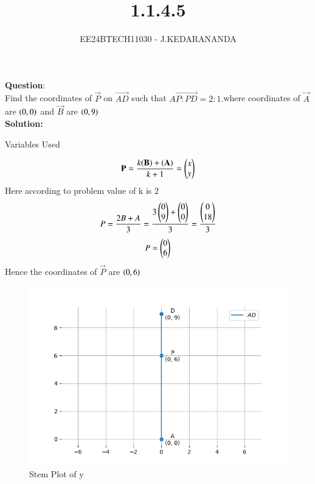 \documentclass[journal]{IEEEtran}
\begin{document}

\vspace{3cm}

\title{1.1.4.5}
\author{EE24BTECH11030 - J.KEDARANANDA
}
{\let\newpage\relax\maketitle}

\renewcommand{\thefigure}{\theenumi}
\renewcommand{\thetable}{\theenumi}
\setlength{\intextsep}{10pt} %


\renewcommand{\thetable}{\theenumi}


\textbf{Question}:\\
Find the coordinates of $\vec{P}$ on $\vec{AD}$ such that $\vec{AP:PD}=2:1.$where coordinates of $\vec{A}$ are $\left(0,0\right)$ and $\vec{B}$ are $\left(0,9\right)$
\\
\textbf{Solution: }
\begin{table}[h!]    
  \centering
  
  \caption{Variables Used}
  \label{tab10.5.3.9.1}
\end{table}
\begin{align}
\mathbf{P}=\frac{k(\mathbf{B})+(\mathbf{A})}{k+1}=\begin{pmatrix}x\\y\end{pmatrix}\\
\end{align}
Here according to problem value of k is 2\\
\begin{align}
P=\frac{2B+A}{3}=\frac{3\begin{pmatrix}0\\9\end{pmatrix}+\begin{pmatrix}0\\0\end{pmatrix}}{3}=\frac{\begin{pmatrix}0\\18\end{pmatrix}}{3}\\
\end{align}
\begin{align}
P=\begin{pmatrix}0\\6\end{pmatrix}
\end{align}
Hence the coordinates of $\vec{P}$ are $\left(0,6\right)$
\begin{figure}[h!]
   \centering
   \includegraphics[width=0.7\linewidth]{figs/Fig1.png}
   \caption{Stem Plot of y}
   \label{stemplot}
\end{figure}
\end{document}
